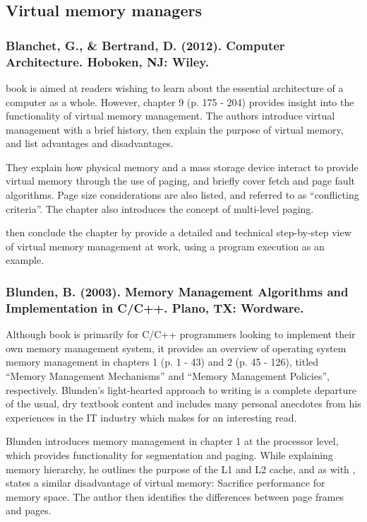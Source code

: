\subsection{Virtual memory managers}

\subsubsection*{Blanchet, G., \& Bertrand, D. (2012). Computer Architecture. Hoboken, NJ: Wiley.}

 book is aimed at readers wishing to learn about the essential architecture of a computer as a whole. However, chapter 9 (p. 175 - 204) provides insight into the functionality of virtual memory management. The authors introduce virtual management with a brief history, then explain the purpose of virtual memory, and list advantages and disadvantages. %

They explain how physical memory and a mass storage device interact to provide virtual memory through the use of paging, and briefly cover fetch and page fault algorithms. Page size considerations are also listed, and referred to as ``conflicting criteria''. The chapter also introduces the concept of multi-level paging.

\citet{Blanchet2012} then conclude the chapter by provide a detailed and technical step-by-step view of virtual memory management at work, using a program execution as an example.

\subsubsection*{Blunden, B. (2003). Memory Management Algorithms and Implementation in C/C++. Plano, TX: Wordware.}

Although  book is primarily for C/C++ programmers looking to implement their own memory management system, it provides an overview of operating system memory management in chapters 1 (p. 1 - 43) and 2 (p. 45 - 126), titled ``Memory Management Mechanisms'' and ``Memory Management Policies'', respectively. Blunden's light-hearted approach to writing is a complete departure of the usual, dry textbook content and includes many personal anecdotes from his experiences in the IT industry which makes for an interesting read.

Blunden introduces memory management in chapter 1 at the processor level, which provides functionality for segmentation and paging. While explaining memory hierarchy, he outlines the purpose of the L1 and L2 cache, and as with \citet{Blanchet2012}, states a similar disadvantage of virtual memory: Sacrifice performance for memory space. The author then identifies the differences between page frames and pages.

